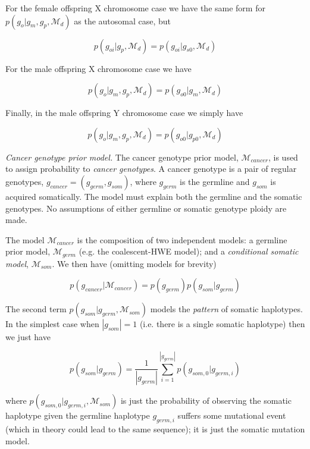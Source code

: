 \documentclass[notitlepage, twocolumn]{article}
\begin{document}
For the female offspring X chromosome case we have the same form for $p(g_o | g_m, g_p, \mathcal{M}_{d})$ as the autosomal case, but

\begin{equation*}
p(g_{oi} | g_p, \mathcal{M}_{d}) = p(g_{oi} | g_{s0}, \mathcal{M}_{d})
\end{equation*}

For the male offspring X chromosome case we have

\begin{equation*}
 p(g_o | g_m, g_p, \mathcal{M}_{d}) = p(g_{o0} | g_m, \mathcal{M}_{d})
\end{equation*}

Finally, in the male offspring Y chromosome case we simply have

\begin{equation*}
 p(g_o | g_m, g_p, \mathcal{M}_{d}) = p(g_{o0} | g_{p0}, \mathcal{M}_{d})
\end{equation*}

\emph{Cancer genotype prior model.} The cancer genotype prior model, $\mathcal{M}_{cancer}$, is used to assign probability to \emph{cancer genotypes}. A cancer genotype is a pair of regular genotypes, $g_{cancer} = (g_{germ}, g_{som})$, where $g_{germ}$ is the germline and $g_{som}$ is acquired somatically. The model must explain both the germline and the somatic genotypes. No assumptions of either germline or somatic genotype ploidy are made.

The model $\mathcal{M}_{cancer}$ is the composition of two independent models: a germline prior model, $\mathcal{M}_{germ}$ (e.g. the coalescent-HWE model); and a \emph{conditional somatic model}, $\mathcal{M}_{som}$. We then have (omitting models for brevity)

\begin{equation*}
 p(g_{cancer} | \mathcal{M}_{cancer}) = p(g_{germ}) p(g_{som} | g_{germ})
\end{equation*}

The second term $p(g_{som} | g_{germ}, \mathcal{M}_{som})$ models the \emph{pattern} of somatic haplotypes. In the simplest case when $|g_{som}| = 1$ (i.e. there is a single somatic haplotype) then we just have

\begin{equation*}
	p(g_{som} | g_{germ}) = \frac{1}{|g_{germ}|} \sum_{i = 1}^{|g_{germ}|} p(g_{som,0} | g_{germ, i})
\end{equation*}

where $p(g_{som,0} | g_{germ, i}, \mathcal{M}_{som})$ is just the probability of observing the somatic haplotype given the germline haplotype $g_{germ, i}$ suffers some mutational event (which in theory could lead to the same sequence); it is just the somatic mutation model.
\end{document}
